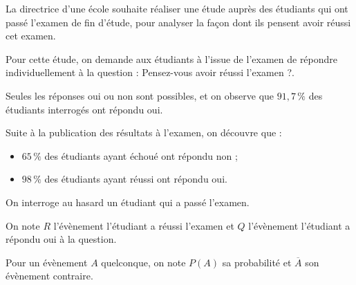 \medskip

La directrice d'une école souhaite réaliser une étude auprès des étudiants qui ont passé l'examen de fin d'étude, pour analyser la façon dont ils pensent avoir réussi cet examen.

\smallskip

Pour cette étude, on demande aux étudiants à l'issue de l'examen de répondre individuellement à la question : \og Pensez-vous avoir réussi l'examen ?\fg.

\smallskip

Seules les réponses  \og oui\fg{} ou \og non \fg{} sont possibles, et on observe que $91,7\,\%$ des étudiants interrogés ont répondu \og oui\fg.

Suite à la publication des résultats à l'examen, on découvre que :
\begin{itemize}
	\item $65\,\%$ des étudiants ayant échoué ont répondu \og non\fg{} ;
	\item $98\,\%$ des étudiants ayant réussi ont répondu \og oui\fg.
\end{itemize}

On interroge au hasard un étudiant qui a passé l'examen.

On note $R$ l'évènement \og l'étudiant a réussi l'examen \fg{} et $Q$ l'évènement \og l'étudiant a répondu \og oui\fg{}  à la question\fg{}.

Pour un évènement $A$ quelconque, on note $P(A)$ sa probabilité et $\overline{A}$ son évènement contraire.

\medskip

